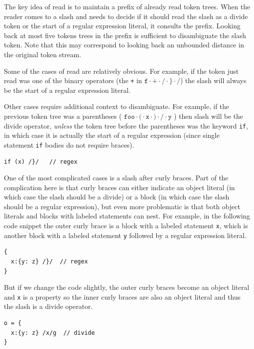 \documentclass[preprint,10pt]{sigplanconf}
\begin{document}
The key idea of read is to maintain a prefix of already read token
trees. When the reader comes to a slash and needs to decide if it
should read the slash as a divide token or the start of a regular
expression literal, it consults the prefix. Looking back at most five
tokens trees in the prefix is sufficient to disambiguate the slash
token. Note that this may correspond to looking back an unbounded
distance in the original token stream.

Some of the cases of read are relatively obvious. For example, if the
token just read was one of the binary operators (\eg the \texttt{+} in
\(\texttt{f} \cdot \texttt{+} \cdot \texttt{/} 
\cdot \texttt{\}} \cdot \texttt{/}
\)) the slash will always be the start of a regular expression
literal. 

Other cases require additional context to disambiguate. For example,
if the previous token tree was a parentheses (\eg 
\(
\texttt{foo} \cdot \texttt{(} \cdot \texttt{x} \cdot \texttt{)} \cdot \texttt{/} \cdot \texttt{y}
\)
) then slash will be the divide
operator, \emph{unless} the token tree before the parentheses was the
keyword \texttt{if}, in which case it is actually the start of a
regular expression (since single statement \texttt{if} bodies do not require
braces).

\begin{lstlisting}
if (x) /}/   // regex
\end{lstlisting}

One of the most complicated cases is a slash after curly braces. Part
of the complication here is that curly braces can either indicate an
object literal (in which case the slash should be a divide) or a block
(in which case the slash should be a regular expression), but even
more problematic is that both object literals and blocks with labeled
statements can nest. For example, in the following code snippet the
outer curly brace is a block with a labeled statement \verb!x!, which
is another block with a labeled statement \verb!y! followed by a
regular expression literal.
\begin{lstlisting}
{
  x:{y: z} /}/  // regex
}
\end{lstlisting}

But if we change the code slightly, the outer curly braces become an
object literal and \verb!x! is a property so the inner curly
braces are also an object literal and thus the slash is a divide operator.

\begin{lstlisting}
o = {
  x:{y: z} /x/g  // divide
}
\end{lstlisting}
\end{document}

